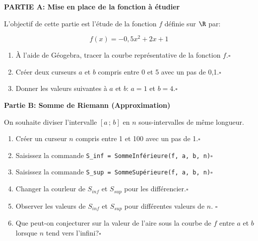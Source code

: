 \documentclass[a4paper,10pt]{report}
\begin{document}
\renewcommand{\labelitemi}{\textbullet}

\pagestyle{DS_FP}
\NomPrenomNote{}


\bigskip



\textbf{PARTIE A: Mise en place de la fonction à étudier}


\medskip

L'objectif de cette partie est l'étude de la fonction $f$ définie sur $\R$ par:

\[f(x)=-0,5x^2+2x+1\]


\begin{enumerate}
    \item À l'aide de Géogebra, tracer la courbe représentative de la fonction $f$.\hfill $\square$
    \item Créer deux curseurs $a$ et $b$ compris entre 0 et 5 avec un pas de 0,1.\hfill $\square$
    \item Donner les valeurs suivantes à $a$ et $b$: $a=1$ et $b=4$.\hfill $\square$
    \end{enumerate}


    \bigskip

    \textbf{Partie B: Somme de Riemann (Approximation)}

    \medskip

    On souhaite diviser l'intervalle $[a\,;\,b]$ en $n$ sous-intervalles de même longueur. 

    \begin{enumerate}
        \item Créer un curseur $n$ compris entre 1 et 100 avec un pas de 1.\hfill $\square$
        \item Saisissez la commande \verb|S_inf = SommeInférieure(f, a, b, n)|\hfill $\square$
        \item Saisissez la commande \verb|S_sup = SommeSupérieure(f, a, b, n)|\hfill $\square$
        \item Changer la courleur de $S_{inf}$ et $S_{sup}$ pour les différencier.\hfill $\square$
        \item Observer les valeurs de $S_{inf}$ et $S_{sup}$ pour différentes valeurs de $n$. \hfill $\square$
        \item Que peut-on conjecturer sur la valeur de l'aire sous la courbe de $f$ entre $a$ et $b$ lorsque $n$ tend vers l'infini?\hfill $\square$
        



    \end{enumerate}
\end{document}
